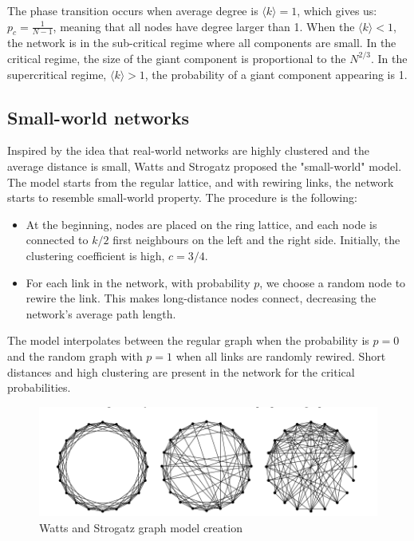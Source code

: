 The phase transition occurs when average degree is $ \langle k  \rangle = 1$, which gives us: $p_c = \frac{1}{N-1}$, meaning that all nodes have degree larger than 1. When the $ \langle k  \rangle < 1$, the network is in the sub-critical regime where all components are small. In the critical regime, the size of the giant component is proportional to the $N^{2/3}$. In the supercritical regime, $ \langle k  \rangle > 1$, the probability of a giant component appearing is 1.

\subsection{Small-world networks}

Inspired by the idea that real-world networks are highly clustered and the average distance is small, Watts and Strogatz proposed the "small-world" model. The model starts from the regular lattice, and with rewiring links, the network starts to resemble small-world property. The procedure is the following:

\begin{itemize}
	\item At the beginning, nodes are placed on the ring lattice, and each node is connected to $k/2$ first neighbours on the left and the right side. Initially, the clustering coefficient is high, $c=3/4$. 
	\item For each link in the network, with probability $p$, we choose a random node to rewire the link. This makes long-distance nodes connect, decreasing the network's average path length. 
\end{itemize}

The model interpolates between the regular graph when the probability is $p=0$ and the random graph with $p=1$ when all links are randomly rewired. Short distances and high clustering are present in the network for the critical probabilities.

\begin{figure}[h!]
	\centering
	\includegraphics[width=0.9\linewidth]{figures/methodology/ws_graph}
	\caption{Watts and Strogatz graph model creation}
	\label{fig:erdist}
\end{figure}


